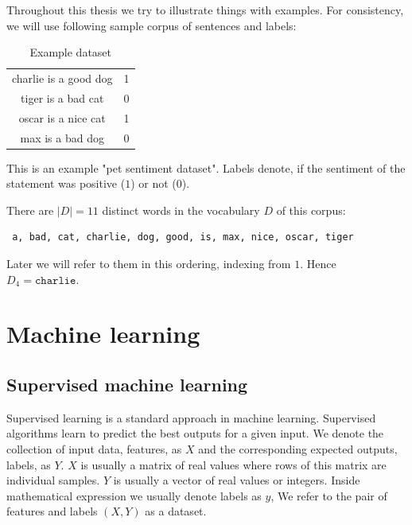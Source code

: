     \* %
    \* %
    
    Throughout this thesis we try to illustrate things with examples. 
    For consistency, we will use following sample corpus of sentences and labels:
    
    \begin{table}[h]
        \centering
        \begin{tabular}{c|c}
        \hline
            charlie is a good dog & 1 \\
            tiger is a bad cat & 0 \\
            oscar is a nice cat & 1 \\
            max is a bad dog & 0 \\
        \end{tabular}
        \caption{Example dataset}
        \label{tab:example:dataset}

    \end{table}
    
    This is an example "pet sentiment dataset". Labels denote, if the sentiment of the statement was positive ($1$) or not ($0$). 

    There are $|D|=11$ distinct words in the vocabulary $D$ of this corpus: 
    \begin{verbatim} a, bad, cat, charlie, dog, good, is, max, nice, oscar, tiger \end{verbatim}
    
    Later we will refer to them in this ordering, indexing from $1$. Hence $D_4=\mathtt{charlie}$.


\section{Machine learning}
    \* %
    \* %
    
    \subsection{Supervised machine learning}
    
    Supervised learning is a standard approach in machine learning. 
    Supervised algorithms learn to predict the best outputs for a given input.
    We denote the collection of input data, features, as $X$ and the corresponding expected outputs, labels, as $Y$.
    $X$ is usually a matrix of real values where rows of this matrix are individual samples.
    $Y$ is usually a vector of real values or integers. 
    Inside mathematical expression we usually denote labels as $y$,
    We refer to the pair of features and labels $(X, Y)$ as a dataset.
    
